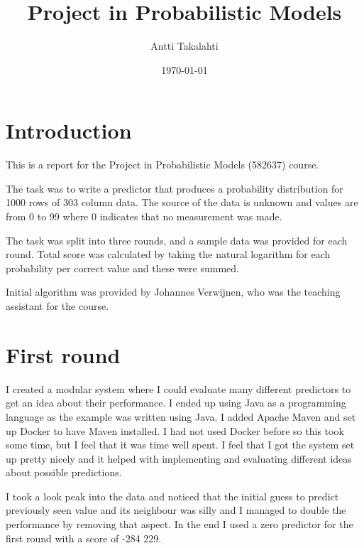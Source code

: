 \documentclass[english]{tktltiki2}
\title{Project in Probabilistic Models}
\author{Antti Takalahti}
\date{\today}
\theoremstyle{definition}
\theoremstyle{remark}
\begin{document}

\frontmatter      %

\maketitle        %

\tableofcontents  %


\mainmatter       %

\section{Introduction}

This is a report for the Project in Probabilistic Models (582637) course. 

The task was to write a predictor that produces a probability distribution for 1000 rows of 303 column data. The source of the data is unknown and values are from 0 to 99 where 0 indicates that no measurement was made.

The task was split into three rounds, and a sample data was provided for each round. Total score was calculated by taking the natural logarithm for each probability per correct value and these were summed.

Initial algorithm was provided by Johannes Verwijnen, who was the teaching assistant for the course.


\section{First round}

I created a modular system where I could evaluate many different predictors to get an idea about their performance. I ended up using Java as a programming language as the example was written using Java. I added Apache Maven and set up Docker to have Maven installed. I had not used Docker before so this took some time, but I feel that it was time well spent. I feel that I got the system set up pretty nicely and it helped with implementing and evaluating different ideas about possible predictions.

I took a look peak into the data and noticed that the initial guess to predict previously seen value and its neighbour was silly and I managed to double the performance by removing that aspect. In the end I used a zero predictor for the first round with a score of -284 229.
\end{document}

